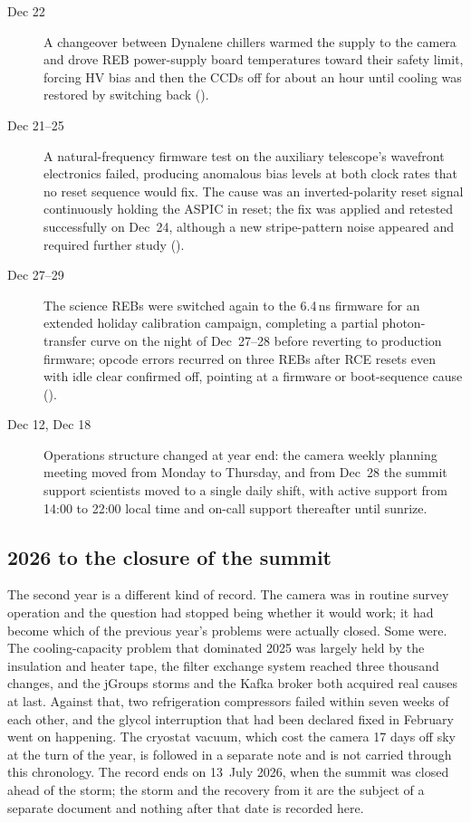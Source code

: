 \begin{description}
\item[Dec 22] A changeover between Dynalene chillers warmed the supply
  to the camera and drove REB power-supply board temperatures toward
  their safety limit, forcing HV bias and then the CCDs off for about
  an hour until cooling was restored by switching back ().

\item[Dec 21--25] A natural-frequency firmware test on the auxiliary
  telescope's wavefront electronics failed, producing anomalous bias
  levels at both clock rates that no reset sequence would fix.  The
  cause was an inverted-polarity reset signal continuously holding the
  ASPIC in reset; the fix was applied and retested successfully on
  Dec~24, although a new stripe-pattern noise appeared and required
  further study ().

\item[Dec 27--29] The science REBs were switched again to the 6.4\,ns
  firmware for an extended holiday calibration campaign, completing a
  partial photon-transfer curve on the night of Dec~27--28 before
  reverting to production firmware; opcode errors recurred on three
  REBs after RCE resets even with idle clear confirmed off, pointing at
  a firmware or boot-sequence cause ().

\item[Dec 12, Dec 18] Operations structure changed at year end: the
  camera weekly planning meeting moved from Monday to Thursday, and
  from Dec~28 the summit support scientists moved to a single daily
  shift, with active support from 14:00 to 22:00 local time and
  on-call support thereafter until sunrize.
\end{description}

\subsection*{2026 to the closure of the summit}

The second year is a different kind of record.  The camera was in
routine survey operation and the question had stopped being whether it
would work; it had become which of the previous year's problems were
actually closed.  Some were.  The cooling-capacity problem that
dominated 2025 was largely held by the insulation and heater tape, the
filter exchange system reached three thousand changes, and the
jGroups storms and the Kafka broker both acquired real causes at last.
Against that, two refrigeration compressors failed within seven weeks
of each other, and the glycol interruption that had been declared fixed
in February went on happening.  The cryostat vacuum, which cost the
camera 17 days off sky at the turn of the year, is followed in a separate
note and is not carried through this chronology.  The record
ends on 13~July 2026, when the summit was closed ahead of the storm;
the storm and the recovery from it are the subject of a separate
document and nothing after that date is recorded here.

